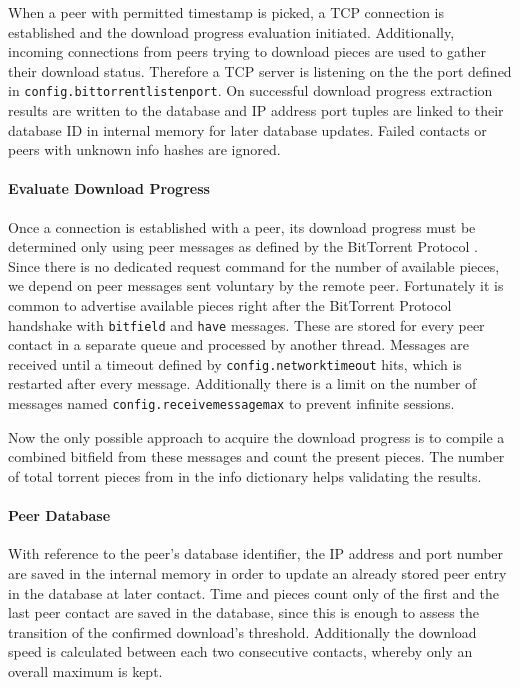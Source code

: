 \documentclass[10pt, a4paper, twoside, headsepline]{scrbook}
\renewcommand{\_}{\origunderscore\allowbreak}
\newcommand{\config}[1]{\texttt{config.\allowbreak #1}}
\begin{document}
When a peer with permitted timestamp is picked, a TCP connection is established and the download progress evaluation initiated. Additionally, incoming connections from peers trying to download pieces are used to gather their download status. Therefore a TCP server is listening on the the port defined in \config{bittorrent\_listen\_port}. On successful download progress extraction results are written to the database and IP address port tuples are linked to their database ID in internal memory for later database updates. Failed contacts or peers with unknown info hashes are ignored.

\paragraph{Evaluate Download Progress}
\label{peer-evaluation}
Once a connection is established with a peer, its download progress must be determined only using peer messages as defined by the BitTorrent Protocol \cite{bep3}. Since there is no dedicated request command for the number of available pieces, we depend on peer messages sent voluntary by the remote peer. Fortunately it is common to advertise available pieces right after the BitTorrent Protocol handshake with \texttt{bitfield} and \texttt{have} messages. These are stored for every peer contact in a separate queue and processed by another thread. Messages are received until a timeout defined by \config{network\_timeout} hits, which is restarted after every message. Additionally there is a limit on the number of messages named \config{receive\_message\_max} to prevent infinite sessions.

Now the only possible approach to acquire the download progress is to compile a combined bitfield from these messages and count the present pieces. The number of total torrent pieces from in the info dictionary helps validating the results.

\paragraph{Peer Database}
With reference to the peer's database identifier, the IP address and port number are saved in the internal memory in order to update an already stored peer entry in the database at later contact. Time and pieces count only of the first and the last peer contact are saved in the database, since this is enough to assess the transition of the confirmed download's threshold. Additionally the download speed is calculated between each two consecutive contacts, whereby only an overall maximum is kept.
\end{document}

